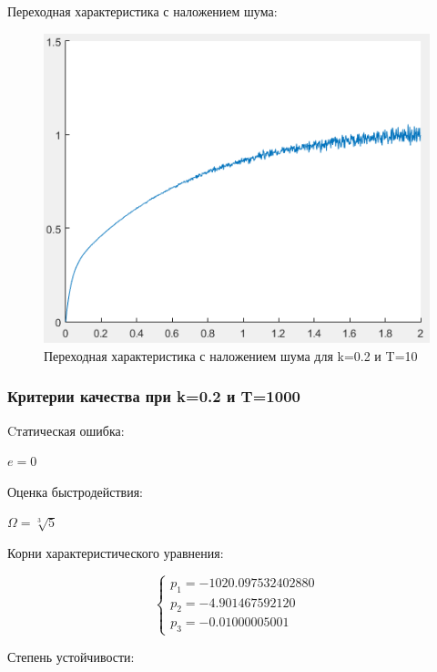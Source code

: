 \documentclass[14pt,a4paper,report]{report}
\begin{document}
Переходная характеристика с наложением шума:

\begin{figure}[h!]
	\centering
	\includegraphics[scale = 0.70]{images/stepnoice10.png}
	\caption{Переходная характеристика с наложением шума для k=0.2 и T=10}
	\label{image:5}
\end{figure}

\subsubsection{Критерии качества при k=0.2 и T=1000}

Cтатическая ошибка:

\begin{center}
$e=0$
\end{center}

Оценка быстродействия:

\begin{center}
$\Omega=\sqrt[3]{5}$
\end{center}

Корни характеристического уравнения:

\begin{equation*}
\begin{cases}
	\text{$p_1=-1020.097532402880$} \\
	\text{$p_2=-4.901467592120$} \\
	\text{$p_3=-0.01000005001$}
\end{cases}
\end{equation*}

Степень устойчивости:
\end{document}
